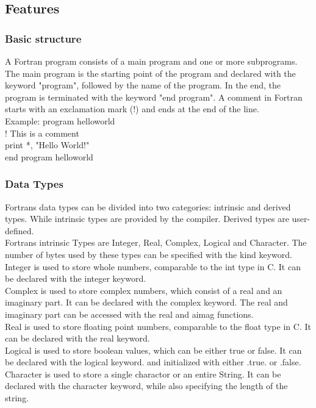 \documentclass[11pt,a4paper]{scrartcl}
\begin{document}
\begin{center}
\subsection{Features}

\subsubsection{Basic structure}
A Fortran program consists of a main program and one or more subprograms. The main program is the starting point of the program and declared with the keyword "program", followed by the name of the program. In the end, the program is terminated with the keyword "end program".
A comment in Fortran starts with an exclamation mark (!) and ends at the end of the line.\\
Example:
program helloworld\\
! This is a comment\\
print *, "Hello World!"\\
end program helloworld\\

\subsubsection{Data Types}
Fortrans data types can be divided into two categories: intrinsic and derived types. While intrinsic types are provided by the compiler. Derived types are user-defined.\\
Fortrans intrinsic Types are Integer, Real, Complex, Logical and Character. The number of bytes used by these types can be specified with the kind keyword.\\
Integer is used to store whole numbers, comparable to the int type in C. It can be declared with the integer keyword.\\
Complex is used to store complex numbers, which consist of a real and an imaginary part. It can be declared with the complex keyword. The real and imaginary part can be accessed with the real and aimag functions.\\ %
Real is used to store floating point numbers, comparable to the float type in C. It can be declared with the real keyword.\\
Logical is used to store boolean values, which can be either true or false. It can be declared with the logical keyword. and initialized with either .true. or .false.\\
Character is used to store a single charactor or an entire String. It can be declared with the character keyword, while also specifying the length of the string.


\end{center}
\end{document}
